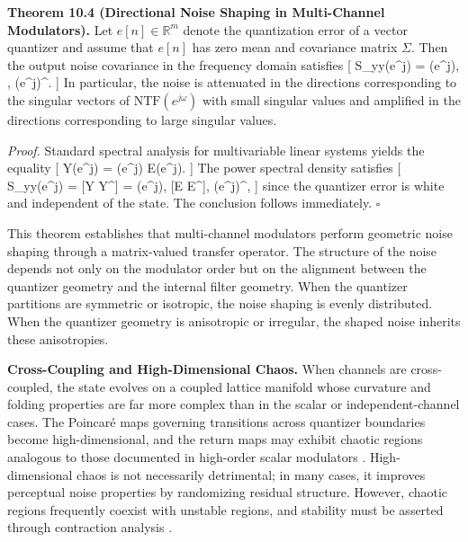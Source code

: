 \medskip

\textbf{Theorem 10.4 (Directional Noise Shaping in Multi-Channel Modulators).}
Let $e[n] \in \mathbb{R}^{m}$ denote the quantization error of a vector quantizer and assume that $e[n]$ has zero mean and covariance matrix $\Sigma$. Then the output noise covariance in the frequency domain satisfies
[
S_{yy}(e^{j\omega}) = (e^{j\omega}), \Sigma, (e^{j\omega})^\ast.
]
In particular, the noise is attenuated in the directions corresponding to the singular vectors of $\mathrm{NTF}(e^{j\omega})$ with small singular values and amplified in the directions corresponding to large singular values.

\textit{Proof.}
Standard spectral analysis for multivariable linear systems \cite{zhou1996robustcontrol} yields the equality
[
Y(e^{j\omega}) = (e^{j\omega}) E(e^{j\omega}).
]
The power spectral density satisfies
[
S_{yy}(e^{j\omega}) = [Y Y^\ast] = (e^{j\omega}), [E E^\ast], (e^{j\omega})^\ast,
]
since the quantizer error is white and independent of the state. The conclusion follows immediately. \hfill $\square$

\medskip

This theorem establishes that multi-channel modulators perform geometric noise shaping through a matrix-valued transfer operator. The structure of the noise depends not only on the modulator order but on the alignment between the quantizer geometry and the internal filter geometry. When the quantizer partitions are symmetric or isotropic, the noise shaping is evenly distributed. When the quantizer geometry is anisotropic or irregular, the shaped noise inherits these anisotropies.

\medskip

\textbf{Cross-Coupling and High-Dimensional Chaos.}
When channels are cross-coupled, the state evolves on a coupled lattice manifold whose curvature and folding properties are far more complex than in the scalar or independent-channel cases. The Poincaré maps governing transitions across quantizer boundaries become high-dimensional, and the return maps may exhibit chaotic regions analogous to those documented in high-order scalar modulators \cite{strogatz1994nonlineardynamics}. High-dimensional chaos is not necessarily detrimental; in many cases, it improves perceptual noise properties by randomizing residual structure. However, chaotic regions frequently coexist with unstable regions, and stability must be asserted through contraction analysis \cite{lohmillerslotine1998contraction}.

